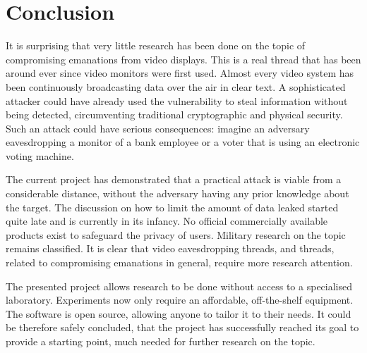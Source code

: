 \documentclass[a4paper,12pt,twoside,openright]{report}
\begin{document}
\section{Conclusion}

It is surprising that very little research has been done on the topic of compromising emanations from video displays. This is a real thread that has been around ever since video monitors were first used. Almost every video system has been continuously broadcasting data over the air in clear text. A sophisticated attacker could have already used the vulnerability to steal information without being detected, circumventing traditional cryptographic and physical security. Such an attack could have serious consequences: imagine an adversary eavesdropping a monitor of a bank employee or a voter that is using an electronic voting machine.

The current project has demonstrated that a practical attack is viable from a considerable distance, without the adversary having any prior knowledge about the target. The discussion on how to limit the amount of data leaked started quite late and is currently in its infancy. No official commercially available products exist to safeguard the privacy of users. Military research on the topic remains classified. It is clear that video eavesdropping threads, and threads, related to compromising emanations in general, require more research attention.

The presented project allows research to be done without access to a specialised laboratory. Experiments now only require an affordable, off-the-shelf equipment. The software is open source, allowing anyone to tailor it to their needs. It could be therefore safely concluded, that the project has successfully reached its goal to provide a starting point, much needed for further research on the topic.

\appendix
\singlespacing

 
 
\end{document}
